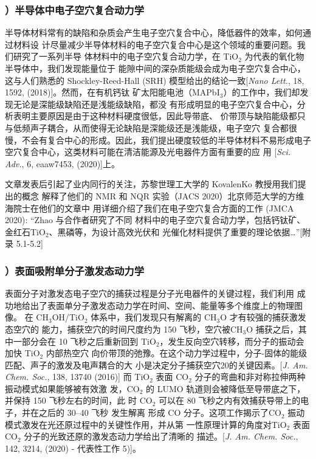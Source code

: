 \subsubsection*{）半导体中电子空穴复合动力学}

半导体材料常有的缺陷和杂质会产生电子空穴复合中心，降低器件的效率，如何通过材料设
计尽量减少半导体材料的电子空穴复合中心是这个领域的重要问题。我们研究了一系列半导
体材料中的电子空穴复合动力学，在 TiO$_2$ 为代表的氧化物半导体中，我们发现能量位于
能隙中间的深杂质能级会成为电子空穴复合中心，这与人们熟悉的 Shockley-Reed-Hall
(SRH) 模型给出的结论一致[\textit{Nano Lett.}, 18, 1592, (2018)]。然而，在有机钙钛
矿太阳能电池（MAPbI$_3$）的工作中，我们却发现无论是深能级缺陷还是浅能级缺陷，都没
有形成明显的电子空穴复合中心，分析表明主要原因是由于这种材料硬度很低，因此导带底、
价带顶与缺陷能级都只与低频声子耦合，从而使得无论缺陷是深能级还是浅能级，电子空穴
复合都很慢，不会有复合中心的形成。因此，我们提出硬度较低的半导体材料不易形成电子
空穴复合中心，这类材料可能在清洁能源及光电器件方面有重要的应
用 [\textit{Sci. Adv.}, 6, eaaw7453, (2020)]上。

\begin{justify}
  \small\kaishu\color{magenta}{}
  文章发表后引起了业内同行的关注，苏黎世理工大学的 KovalenKo 教授用我们提出的概念
  解释了他们的 NMR 和 NQR 实验（JACS 2020）北京师范大学的方维海院士在他们的文章中
  用详细介绍了我们在电子空穴复合方面的工作 (JMCA 2020): “Zhao 与合作者研究了不同
  材料中的电子空穴复合动力学，包括钙钛矿、金红石TiO$_2$、黑磷等，为设计高效光伏和
  光催化材料提供了重要的理论依据\ldots{}”[附录 5.1-5.2]
\end{justify}


\subsubsection*{）表面吸附单分子激发态动力学}

表面分子对激发态电子空穴的捕获过程是分子光电器件的关键过程，我们利用 \hnamd{} 成
功地给出了表面单分子激发态动力学在时间、空间、能量等多个维度上的物理图像。
在 CH$_3$OH/TiO$_2$ 体系中，我们发现只有解离的 CH$_3$O 才有较强的捕获激发态空穴的
能力，捕获空穴的时间尺度约为 150 飞秒，空穴被CH$_3$O 捕获之后，其中一部分会在 10
飞秒之后重新回到 TiO$_2$，发生反向空穴转移，而分子的振动会加快 TiO$_2$ 内部热空穴
向价带顶的弛豫。在这个动力学过程中，分子-固体的能级匹配、声子的激发及电声耦合的大
小是决定分子捕获空穴20的关键因素。[\textit{J. Am. Chem. Soc.}, 138, 13740
(2016)] 而 TiO$_2$ 表面 CO$_2$ 分子的弯曲和非对称拉伸两种振动模式如果能够被有效激
发，CO$_2$ 的 LUMO 轨道则会被降低至导带底之下，并保持 150 飞秒左右的时间，此
时 CO$_2$ 可以在 80 飞秒之内有效捕获导带上的电子，并在之后的 30--40 飞秒 发生解离
形成 CO 分子。这项工作揭示了CO$_2$ 振动模式激发在光还原过程中的关键性作用，并从第
一性原理计算的角度对TiO$_2$ 表面 CO$_2$ 分子的光致还原的激发态动力学给出了清晰的
描述。[\textit{J. Am. Chem.  Soc.}, 142, 3214, (2020) - 代表性工作 5)]。
  
